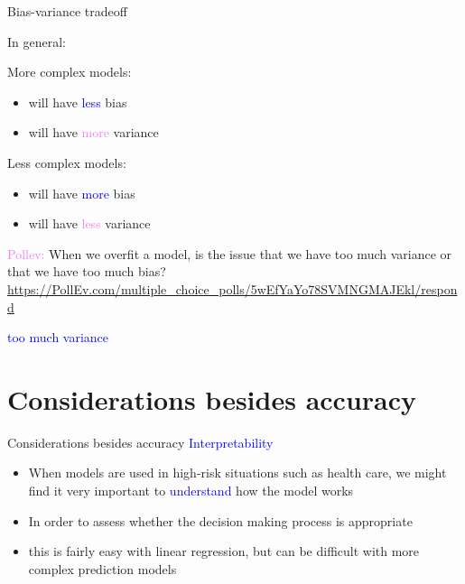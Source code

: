 \documentclass[10pt,t]{beamer}
\begin{document}
\begin{frame}{Bias-variance tradeoff}
	\vspace{-5 mm}
	
	In general:
	\bigskip
	
	More complex models:
	\medskip
	\begin{itemize}
		\item will have \textcolor{blue}{less} bias
		\medskip
		\item will have \textcolor{violet}{more} variance
	\end{itemize}
	\bigskip
	
	Less complex models:
	\medskip
	\begin{itemize}
		\item will have \textcolor{blue}{more} bias
		\medskip
		\item will have \textcolor{violet}{less} variance
	\end{itemize}
	\medskip
	
	\textcolor{violet}{Pollev:}{ When we overfit a model, is the issue that we have too much variance or that we have too much bias?}
	\scriptsize{\url{https://PollEv.com/multiple_choice_polls/5wEfYaYo78SVMNGMAJEkl/respond}}\pause
	\medskip
	
	\normalsize
	\textcolor{blue}{too much variance}


\end{frame}



\section{Considerations besides accuracy}

\begin{frame}{Considerations besides accuracy}
	\textcolor{blue}{Interpretability}
	\medskip
	\begin{itemize}
	\item When models are used in high-risk situations such as health care, we might find it very important to \textcolor{blue}{understand} how the model works
	\medskip
	\item In order to assess whether the decision making process is appropriate
	\medskip
	\item this is fairly easy with linear regression, but can be difficult with more complex prediction models 
	\end{itemize}
	
\end{frame}
\end{document}
